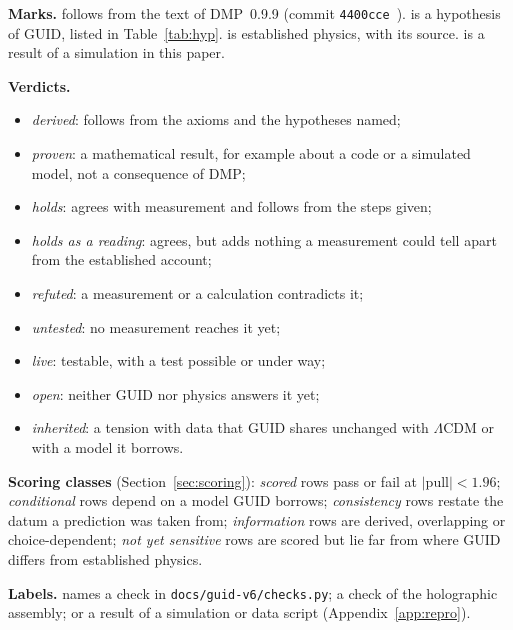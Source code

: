 \documentclass[11pt,a4paper]{article}
\begin{document}
\begin{tcolorbox}[breakable,enhanced,colback=black!3,colframe=black!45,boxrule=0.5pt,arc=1pt,fonttitle=\bfseries\small,
title={Box 1: marks, verdicts and scoring classes}]\small
\textbf{Marks.} \tagD{} follows from the text of DMP~0.9.9 (commit \texttt{4400cce}~\cite{dmp}). \tagH{} is a hypothesis of GUID, listed
in Table~\ref{tab:hyp}. \tagP{} is established physics, with its source. \tagS{} is a result of a simulation in this paper.

\textbf{Verdicts.}
\begin{itemize}[nosep]
\item \emph{derived}: follows from the axioms and the hypotheses named;
\item \emph{proven}: a mathematical result, for example about a code or a simulated model, not a consequence of DMP;
\item \emph{holds}: agrees with measurement and follows from the steps given;
\item \emph{holds as a reading}: agrees, but adds nothing a measurement could tell apart from the established account;
\item \emph{refuted}: a measurement or a calculation contradicts it;
\item \emph{untested}: no measurement reaches it yet;
\item \emph{live}: testable, with a test possible or under way;
\item \emph{open}: neither GUID nor physics answers it yet;
\item \emph{inherited}: a tension with data that GUID shares unchanged with $\Lambda$CDM or with a model it borrows.
\end{itemize}

\textbf{Scoring classes} (Section~\ref{sec:scoring}): \emph{scored} rows pass or fail at $|$pull$|<1.96$; \emph{conditional} rows depend on
a model GUID borrows; \emph{consistency} rows restate the datum a prediction was taken from; \emph{information} rows are derived,
overlapping or choice-dependent; \emph{not yet sensitive} rows are scored but lie far from where GUID differs from established physics.

\textbf{Labels.}  names a check in \texttt{docs/guid-v6/checks.py};  a check of the holographic assembly;
 or  a result of a simulation or data script (Appendix~\ref{app:repro}).
\end{tcolorbox}
\end{document}
